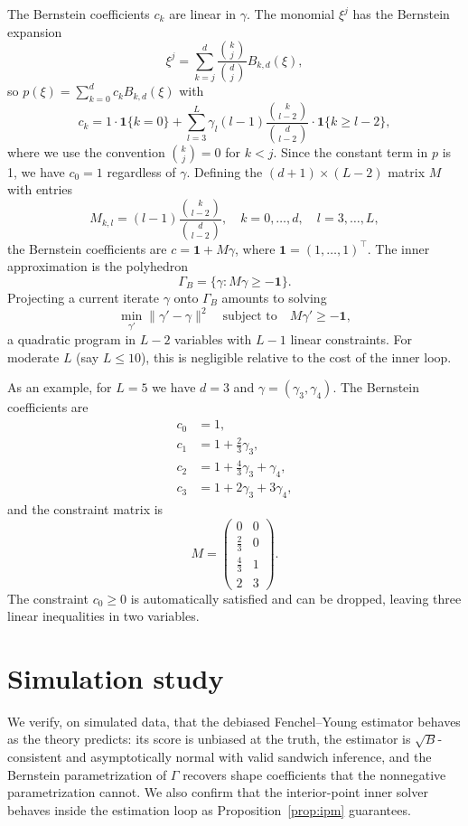 \documentclass[12pt]{article}
\begin{document}
The Bernstein coefficients $c_k$ are linear in $\gamma$. The monomial $\xi^j$ has the Bernstein expansion
\[
    \xi^j = \sum_{k=j}^{d} \frac{\binom{k}{j}}{\binom{d}{j}} B_{k,d}(\xi),
\]
so $p(\xi) = \sum_{k=0}^{d} c_k B_{k,d}(\xi)$ with
\[
    c_k = 1 \cdot \mathbf{1}\{k = 0\} + \sum_{l=3}^{L} \gamma_l (l-1) \frac{\binom{k}{l-2}}{\binom{d}{l-2}} \cdot \mathbf{1}\{k \geq l-2\},
\]
where we use the convention $\binom{k}{j} = 0$ for $k < j$. Since the constant term in $p$ is 1, we have $c_0 = 1$ regardless of $\gamma$. Defining the $(d+1) \times (L-2)$ matrix $M$ with entries
\[
    M_{k,l} = (l-1) \frac{\binom{k}{l-2}}{\binom{d}{l-2}}, \quad k = 0, \ldots, d, \quad l = 3, \ldots, L,
\]
the Bernstein coefficients are $c = \mathbf{1} + M\gamma$, where $\mathbf{1} = (1, \ldots, 1)^\top$. The inner approximation is the polyhedron
\[
    \Gamma_B = \{\gamma : M\gamma \geq -\mathbf{1}\}.
\]
Projecting a current iterate $\gamma$ onto $\Gamma_B$ amounts to solving
\[
    \min_{\gamma'} \|\gamma' - \gamma\|^2 \quad \text{subject to} \quad M\gamma' \geq -\mathbf{1},
\]
a quadratic program in $L-2$ variables with $L-1$ linear constraints. For moderate $L$ (say $L \leq 10$), this is negligible relative to the cost of the inner loop.

As an example, for $L = 5$ we have $d = 3$ and $\gamma = (\gamma_3, \gamma_4)$. The Bernstein coefficients are
\begin{align*}
    c_0 &= 1, \\
    c_1 &= 1 + \tfrac{2}{3}\gamma_3, \\
    c_2 &= 1 + \tfrac{4}{3}\gamma_3 + \gamma_4, \\
    c_3 &= 1 + 2\gamma_3 + 3\gamma_4,
\end{align*}
and the constraint matrix is
\[
    M = \begin{pmatrix} 0 & 0 \\ \tfrac{2}{3} & 0 \\ \tfrac{4}{3} & 1 \\ 2 & 3 \end{pmatrix}.
\]
The constraint $c_0 \geq 0$ is automatically satisfied and can be dropped, leaving three linear inequalities in two variables.



\section{Simulation study}\label{sec:simulation}

We verify, on simulated data, that the debiased Fenchel--Young estimator behaves as
the theory predicts: its score is unbiased at the truth, the estimator is
$\sqrt B$-consistent and asymptotically normal with valid sandwich inference, and
the Bernstein parametrization of $\Gamma$ recovers shape coefficients that the
nonnegative parametrization cannot. We also confirm that the interior-point inner
solver behaves inside the estimation loop as Proposition~\ref{prop:ipm} guarantees.
\end{document}
